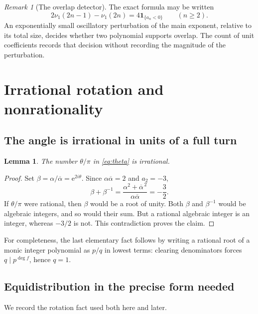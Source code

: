 \documentclass[11pt]{article}
\newtheorem{lemma}[theorem]{Lemma}
\theoremstyle{definition}\newtheorem{definition}[theorem]{Definition}
\theoremstyle{remark}\newtheorem{remark}[theorem]{Remark}
\newcommand{\ind}{\mathbf 1}
\newcommand{\nuone}{\nu_1}
\newcommand{\ee}{\mathrm e}
\begin{document}
\begin{remark}[The overlap detector]
The exact formula may be written
\begin{equation}\label{eq:deficit}
 2\nuone(2n-1)-\nuone(2n)=4\ind_{\{a_n<0\}}\qquad(n\geq2).
\end{equation}
An exponentially small oscillatory perturbation of the main exponent, relative to its total size, decides whether two polynomial supports overlap. The count of unit coefficients records that decision without recording the magnitude of the perturbation.
\end{remark}

\section{Irrational rotation and nonrationality}

\subsection{The angle is irrational in units of a full turn}

\begin{lemma}\label{lem:irrational}
The number $\theta/\pi$ in \eqref{eq:theta} is irrational.
\end{lemma}
\begin{proof}
Set $\beta=\alpha/\overline\alpha=\ee^{2i\theta}$. Since $\alpha\overline\alpha=2$ and $a_2=-3$,
\[
 \beta+\beta^{-1}
 =\frac{\alpha^2+\overline\alpha^{\,2}}{\alpha\overline\alpha}
 =-\frac32.
\]
If $\theta/\pi$ were rational, then $\beta$ would be a root of unity. Both $\beta$ and $\beta^{-1}$ would be algebraic integers, and so would their sum. But a rational algebraic integer is an integer, whereas $-3/2$ is not. This contradiction proves the claim.
\end{proof}

For completeness, the last elementary fact follows by writing a rational root of a monic integer polynomial as $p/q$ in lowest terms: clearing denominators forces $q\mid p^{\deg f}$, hence $q=1$.

\subsection{Equidistribution in the precise form needed}

We record the rotation fact used both here and later.
\end{document}
